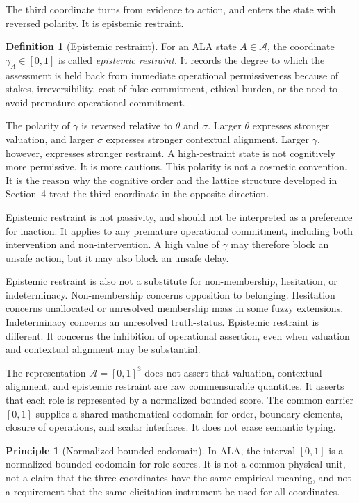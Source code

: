 \documentclass[reqno,final]{amsart}
\theoremstyle{definition}
\newtheorem{definition}{Definition}
\newtheorem{principle}{Principle}
\theoremstyle{plain}
\theoremstyle{remark}
\providecommand{\cA}{\mathcal{A}}
\begin{document}
The third coordinate turns from evidence to action, and enters the state with reversed polarity. It is epistemic restraint.

\begin{definition}[Epistemic restraint]
For an ALA state \(A\in\cA\), the coordinate \(\gamma_A\in[0,1]\) is called \emph{epistemic restraint}. It records the degree to which the assessment is held back from immediate operational permissiveness because of stakes, irreversibility, cost of false commitment, ethical burden, or the need to avoid premature operational commitment.
\end{definition}

The polarity of \(\gamma\) is reversed relative to \(\theta\) and \(\sigma\). Larger \(\theta\) expresses stronger valuation, and larger \(\sigma\) expresses stronger contextual alignment. Larger \(\gamma\), however, expresses stronger restraint. A high-restraint state is not cognitively more permissive. It is more cautious. This polarity is not a cosmetic convention. It is the reason why the cognitive order and the lattice structure developed in Section~4 treat the third coordinate in the opposite direction.

Epistemic restraint is not passivity, and should not be interpreted as a preference for inaction.
It applies to any premature operational commitment, including both
intervention and non-intervention. A high value of \(\gamma\) may therefore
block an unsafe action, but it may also block an unsafe delay.

Epistemic restraint is also not a substitute for non-membership, hesitation, or indeterminacy. Non-membership concerns opposition to belonging. Hesitation concerns unallocated or unresolved membership mass in some fuzzy extensions. Indeterminacy concerns an unresolved truth-status. Epistemic restraint is different. It concerns the inhibition of operational assertion, even when valuation and contextual alignment may be substantial.

The representation \(\cA=[0,1]^3\) does not assert that valuation, contextual alignment, and epistemic restraint are raw commensurable quantities. It asserts that each role is represented by a normalized bounded score. The common carrier \([0,1]\) supplies a shared mathematical codomain for order, boundary elements, closure of operations, and scalar interfaces. It does not erase semantic typing.

\begin{principle}[Normalized bounded codomain]
In ALA, the interval \([0,1]\) is a normalized bounded codomain for role scores. It is not a common physical unit, not a claim that the three coordinates have the same empirical meaning, and not a requirement that the same elicitation instrument be used for all coordinates.
\end{principle}
\end{document}
